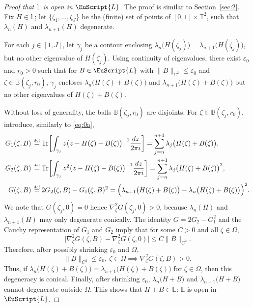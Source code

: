 \documentclass[10pt]{amsart}
\let\pazocal\EuScript
\theoremstyle{definition}
\DeclareMathOperator{\Tr}{Tr}
\newcommand{\LL}{{\pazocal{L}}}
\newcommand{\Bb}{\mathbb{B}}
\newcommand{\Ll}{\mathbb{L}}
\newcommand{\Tt}{{\mathbb{T}}}
\let\epsi\varepsilon
\newcommand{\de}{\,\mathrel{\stackrel{\makebox[0pt]{\mbox{\normalfont\tiny def}}}{=}}}
\begin{document}
\begin{proof}[Proof that $\Ll$ is open in $\LL$] The proof is similar to Section~\ref{sec:2}. Fix $H \in \Ll$; let $\{ \zeta_1, \dots, \zeta_J\}$ be the (finite) set of points of $[0,1] \times \Tt^2$, such that $\lambda_n(H)$ and $\lambda_{n+1}(H)$ degenerate.

For each $j \in [1,J]$, let $\gamma_j$ be a contour enclosing $\lambda_n\bigl(H(\zeta_j)\bigr) = \lambda_{n+1}\bigl(H(\zeta_j)\bigr)$, but no other eigenvalue of $H(\zeta_j)$. Using continuity of eigenvalues, there exist $\epsi_0$ and $r_0 > 0$ such that for $B \in \LL$ with $\| B \|_{C^2} \leq \epsi_0$ and $\zeta \in \Bb(\zeta_j,r_0)$, $\gamma_j$ encloses
$\lambda_n\bigl(H(\zeta) + B(\zeta)\bigr)$ and $\lambda_{n+1}\bigl(H(\zeta) + B(\zeta)\bigr)$ but no other eigenvalues of $H(\zeta) + B(\zeta)$.

Without loss of generality, the balls $\Bb(\zeta_j,r_0)$ are disjoints. For $\zeta \in \Bb(\zeta_j,r_0)$, introduce, similarly to \eqref{eq:0a},
\[
\begin{split}
G_1(\zeta,B) &\de \Tr \biggl[ \int_{\gamma_j} z \bigl(z-H(\zeta)-B(\zeta)\bigr)^{-1} \dfrac{dz}{2\pi i} \biggr] = \sum_{j = n}^{n+1}\lambda_j\bigl(H(\zeta)+B(\zeta)\bigr),
\\
G_2(\zeta,B) &\de \Tr \biggl[ \int_{\gamma_j} z^2 \bigl(z-H(\zeta)-B(\zeta)\bigr)^{-1} \dfrac{dz}{2\pi i} \biggr] = \sum_{j = n}^{n+1} \lambda_j\bigl(H(\zeta)+B(\zeta)\bigr)^2,
\\
G(\zeta,B) &\de 2G_2(\zeta,B) - G_1(\zeta,B)^2 = \Bigl(\lambda_{n+1}\bigl(H(\zeta)+B(\zeta)\bigr) - \lambda_n\bigl(H(\zeta)+B(\zeta)\bigr)\Bigr)^2.
\end{split}
\]
We note that $G(\zeta_j,0) = 0$ hence $\nabla^2_\zeta G(\zeta_j,0) > 0$, because $\lambda_n(H)$ and $\lambda_{n+1}(H)$ may only degenerate conically. The identity $G = 2G_2-G_1^2$ and the Cauchy representation of $G_1$ and $G_2$ imply that for some $C > 0$ and all $\zeta \in \Omega$,
\begin{equation*}
\big| \nabla^2_\zeta G(\zeta,B) - \nabla^2_\zeta G(\zeta,0) \big| \leq C \| B \|_{C^2}.
\end{equation*}
Therefore, after possibly shrinking $\epsi_0$ and $\Omega$,
\begin{equation*}
\| B \|_{C^2} \leq \epsi_0, \ \zeta \in \Omega \implies \nabla^2_\zeta G(\zeta,B) > 0.
\end{equation*}
Thus, if $\lambda_n\bigl(H(\zeta) + B(\zeta)\bigr) = \lambda_{n+1}\bigl(H(\zeta) + B(\zeta)\bigr)$ for $\zeta\in \Omega$, then this degeneracy is conical. Finally, after shrinking $\epsi_0$, $\lambda_n\bigl(H + B\bigr)$ and $\lambda_{n+1}\bigl(H + B\bigr)$ cannot degenerate outside $\Omega$. This shows that $H+B \in \Ll$: $\Ll$ is open in $\LL$.
\end{proof}
\end{document}
